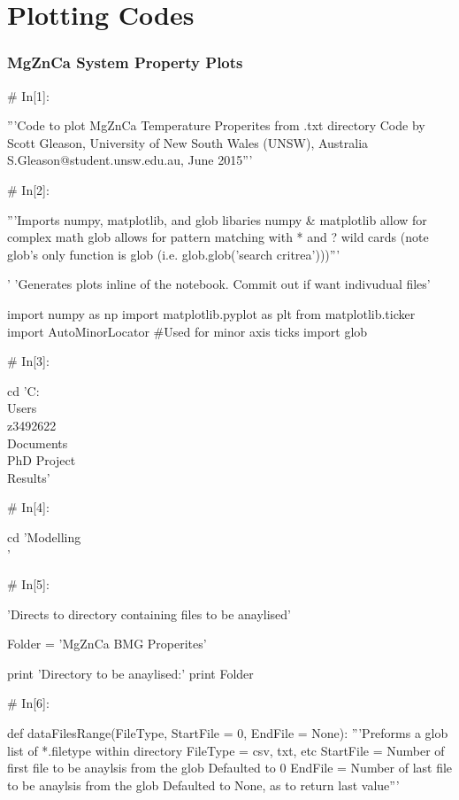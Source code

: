 \documentclass[a4paper,8pt]{article}
\begin{document}
\section{Plotting Codes}
\subsubsection{MgZnCa System Property Plots}

\begin{python}
# In[1]:

'''Code to plot MgZnCa Temperature Properites from .txt directory
Code by Scott Gleason, University of New South Wales (UNSW), Australia 
S.Gleason@student.unsw.edu.au, June 2015'''


# In[2]:

'''Imports numpy, matplotlib, and glob libaries 
numpy & matplotlib allow for complex math
glob allows for pattern matching with * and ? wild cards
(note glob's only function is glob (i.e. glob.glob('search critrea')))'''

'%
'Generates plots inline of the notebook. Commit out if want indivudual files'

import numpy as np
import matplotlib.pyplot as plt
from matplotlib.ticker import AutoMinorLocator #Used for minor axis ticks
import glob


# In[3]:

cd 'C:\\Users\\z3492622\\Documents\\PhD Project\\Results'


# In[4]:

cd 'Modelling\\'


# In[5]:

'Directs to directory containing files to be anaylised'

Folder = 'MgZnCa BMG Properites'

print 'Directory to be anaylised:'
print Folder


# In[6]:

def dataFilesRange(FileType, StartFile = 0, EndFile = None):
'''Preforms a glob list of *.filetype within directory
FileType = csv, txt, etc
StartFile = Number of first file to be anaylsis from the glob
Defaulted to 0
EndFile = Number of last file to be anaylsis from the glob
Defaulted to None, as to return last value'''


\end{python}
\end{document}
